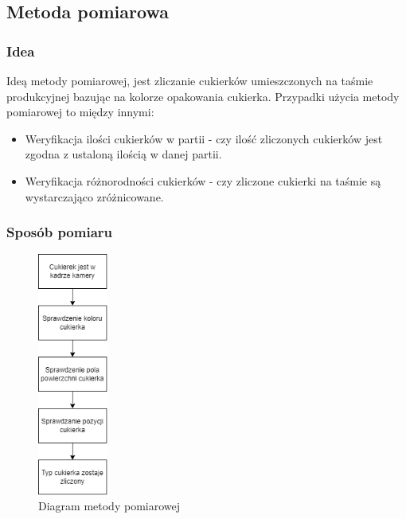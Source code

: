 \documentclass{article}
\begin{document}
\subsection{Metoda pomiarowa}
\label{Metoda pomiarowa}
\subsubsection{Idea}
\label{Idea}

Ideą metody pomiarowej, jest zliczanie cukierków umieszczonych na taśmie produkcyjnej bazując na kolorze opakowania cukierka. Przypadki użycia metody pomiarowej to między innymi:

\begin{itemize}
    \item Weryfikacja ilości cukierków w partii - czy ilość zliczonych cukierków jest zgodna z ustaloną ilością w danej partii.
    \item Weryfikacja różnorodności cukierków - czy zliczone cukierki na taśmie są wystarczająco zróżnicowane.
\end{itemize}

\subsubsection{Sposób pomiaru}
\label{Sposób pomiaru}

\begin{figure}[H]
    \centering
    \includegraphics[height=8cm]{diagramMetody.png}
    \caption{Diagram metody pomiarowej}
    \label{fig:diagramMetody}
\end{figure}
\end{document}
